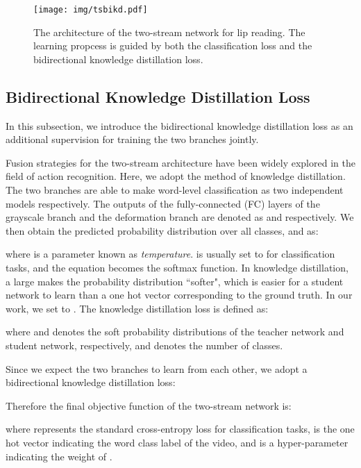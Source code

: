 \documentclass[a4paper, 10pt, conference]{ieeeconf}      \usepackage{FG2020}
\begin{document}
\begin{figure}
   \centering
   \texttt{[image: img/tsbikd.pdf]}
   \caption{The architecture of the two-stream network for lip reading. The learning propcess is guided by both the classification loss and the bidirectional knowledge distillation loss.}
   \label{fig:ts}
   \vspace{-0.4cm}
   \end{figure}










 
 \subsection{Bidirectional Knowledge Distillation Loss}
 \label{sec:bikd}
 In this subsection, we introduce the bidirectional knowledge distillation loss as an additional supervision for training the two branches jointly.
 
 Fusion strategies for the two-stream architecture have been widely explored in the field of action recognition. Here, we adopt the method of knowledge distillation.
 The two branches are able to make word-level classification as two independent models respectively. The outputs of the fully-connected (FC) layers of the grayscale branch and the deformation branch are denoted as  and  respectively. We then obtain the predicted probability distribution over all classes,  and  as: 
 
 
 where  is a parameter known as \textit{temperature}.  is usually set to  for classification tasks, and the equation becomes the softmax function. In knowledge distillation, a large  makes the probability distribution  ``softer", which is easier for a student network to learn than a one hot vector corresponding to the ground truth. In our work, we set  to . The knowledge distillation loss is defined as:
 
    where  and  denotes the soft probability distributions of the teacher network and student network, respectively, and  denotes the number of classes. 
    
    Since we expect the two branches to learn from each other, we adopt a bidirectional knowledge distillation loss:
    
 Therefore the final objective function of the two-stream network is:
 
 where  represents the standard cross-entropy loss for classification tasks,  is the one hot vector indicating the word class label of the video, and  is a hyper-parameter indicating the weight of .
\end{document}
